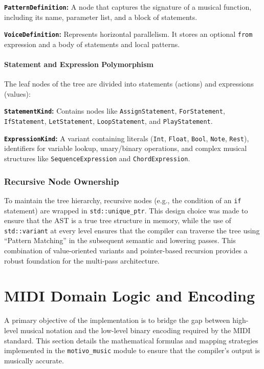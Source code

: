 \noindent \textbf{\texttt{PatternDefinition}:} A node that captures the signature of a musical function, including its
name, parameter list, and a block of statements.

\noindent \textbf{\texttt{VoiceDefinition}:} Represents horizontal parallelism.
It stores an optional \texttt{from} expression and a body of statements and local patterns.

\paragraph{Statement and Expression Polymorphism}
The leaf nodes of the tree are divided into statements (actions) and expressions (values):

\noindent \textbf{\texttt{StatementKind}:} Contains nodes like \texttt{AssignStatement}, \texttt{ForStatement},
\texttt{IfStatement}, \texttt{LetStatement}, \texttt{LoopStatement}, and \texttt{PlayStatement}.

\noindent \textbf{\texttt{ExpressionKind}:} A variant containing literals (\texttt{Int}, \texttt{Float}, \texttt{Bool},
\texttt{Note}, \texttt{Rest}), identifiers for variable lookup, unary/binary operations, and complex musical
structures like \texttt{SequenceExpression} and \texttt{ChordExpression}.

\subsubsection{Recursive Node Ownership}

To maintain the tree hierarchy, recursive nodes (e.g., the condition of an \texttt{if} statement) are wrapped in
\texttt{std::unique\_ptr}.
This design choice was made to ensure that the AST is a true tree structure in memory, while the use of
\texttt{std::variant} at every level ensures that the compiler can traverse the tree using ``Pattern Matching'' in the
subsequent semantic and lowering passes.
This combination of value-oriented variants and pointer-based recursion provides a robust foundation for the multi-pass
architecture.


\section{MIDI Domain Logic and Encoding}\label{detail-sec:implementation-music-logic}

A primary objective of the implementation is to bridge the gap between high-level musical notation and the low-level
binary encoding required by the MIDI standard.
This section details the mathematical formulas and mapping strategies implemented in the
\texttt{motivo\_music} module to
ensure that the compiler's output is musically accurate.

